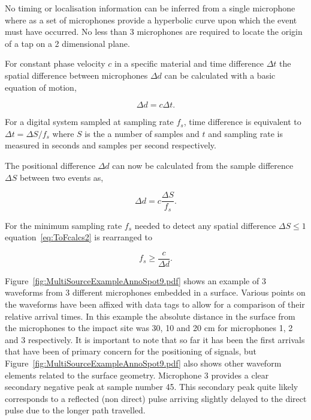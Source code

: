 No timing or localisation information can be inferred from a single microphone where as a set of microphones provide a hyperbolic curve upon which the event must have occurred. No less than 3 microphones are required to locate the origin of a tap on a 2 dimensional plane\cite{US7411581}. %

For constant phase velocity $c$ in a specific material and time difference $\Delta t$ the spatial difference between microphones $\Delta d$ can be calculated with a basic equation of motion,

\begin{equation}\label{eq:ToFcalcs1}
\Delta d  = c \Delta t.
\end{equation}

For a digital system sampled at sampling rate $f_s$, time difference is equivalent to $\Delta t = \Delta S/f_s$ where $S$ is the a number of samples and $t$ and sampling rate is measured in seconds and samples per second respectively.

The positional difference $\Delta d$ can now be calculated from the sample difference $\Delta S$ between two events as,

\begin{equation}\label{eq:ToFcalcs2}
\Delta d  = c \frac{\Delta S}{f_s}.
\end{equation}

For the minimum sampling rate $f_s$ needed to detect any spatial difference $\Delta S \leq 1$ equation~\ref{eq:ToFcalcs2} is rearranged to

\begin{equation}\label{eq:ToFcalcs3}
f_s  \geq \frac{c}{\Delta d}.
\end{equation}

Figure~\ref{fig:MultiSourceExampleAnnoSpot9.pdf} shows an example of 3 waveforms from 3 different microphones embedded in a surface. Various points on the waveforms have been affixed with data tags to allow for a comparison of their relative arrival times. In this example the absolute distance in the surface from the microphones to the impact site was 30, 10 and 20 cm for microphones 1, 2 and 3 respectively. It is important to note that so far it has been the first arrivals that have been of primary concern for the positioning of signals, but Figure~\ref{fig:MultiSourceExampleAnnoSpot9.pdf} also shows other waveform elements related to the surface geometry. Microphone 3 provides a clear secondary negative peak at sample number 45. This secondary peak quite likely corresponds to a reflected (non direct) pulse arriving slightly delayed to the direct pulse due to the longer path travelled.

